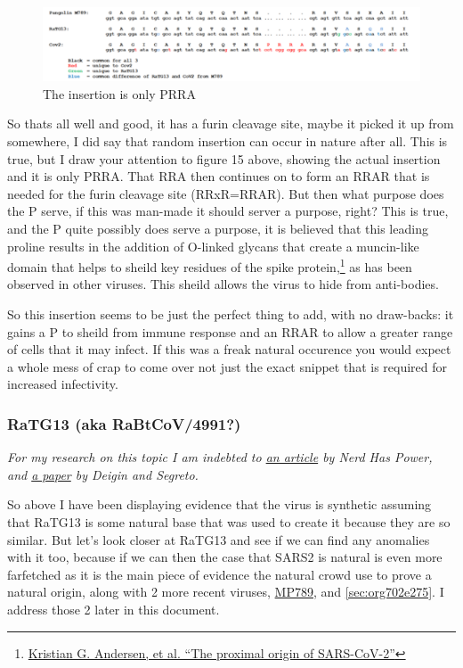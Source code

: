 \documentclass[11pt]{article}
\begin{document}
\begin{figure}[htbp]
\centering
\includegraphics[width=.9\linewidth]{./images/prra-insertion.png}
\caption{The insertion is only PRRA}
\end{figure}

So thats all well and good, it has a furin cleavage site, maybe it picked it up from somewhere, I did say that random insertion can occur in nature after all. This is true, but I draw your attention to figure 15 above, showing the actual insertion and it is only PRRA. That RRA then continues on to form an RRAR that is needed for the furin cleavage site (RRxR=RRAR). But then what purpose does the P serve, if this was man-made it should server a purpose, right? This is true, and the P quite possibly does serve a purpose, it is believed that this leading proline results in the addition of O-linked glycans that create a muncin-like domain that helps to sheild key residues of the spike protein,\footnote{\href{https://www.nature.com/articles/s41591-020-0820-9.pdf}{Kristian G. Andersen, et al. ``The proximal origin of SARS-CoV-2''}} as has been observed in other viruses. This sheild allows the virus to hide from anti-bodies.

So this insertion seems to be just the perfect thing to add, with no draw-backs: it gains a P to sheild from immune response and an RRAR to allow a greater range of cells that it may infect. If this was a freak natural occurence you would expect a whole mess of crap to come over not just the exact snippet that is required for increased infectivity.

\subsubsection{RaTG13 (aka RaBtCoV/4991?)}
\label{sec:org69aa952}
\emph{For my research on this topic I am indebted to \href{https://nerdhaspower.weebly.com/ratg13-is-fake.html}{an article} by Nerd Has Power, and \href{https://onlinelibrary.wiley.com/doi/full/10.1002/bies.202100015}{a paper} by Deigin and Segreto.}

So above I have been displaying evidence that the virus is synthetic assuming that RaTG13 is some natural base that was used to create it because they are so similar. But let's look closer at RaTG13 and see if we can find any anomalies with it too, because if we can then the case that SARS2 is natural is even more farfetched as it is the main piece of evidence the natural crowd use to prove a natural origin, along with 2 more recent viruses, \hyperref[sec:org4e2c9a0]{MP789}, and \ref{sec:org702e275}. I address those 2 later in this document.
\end{document}

